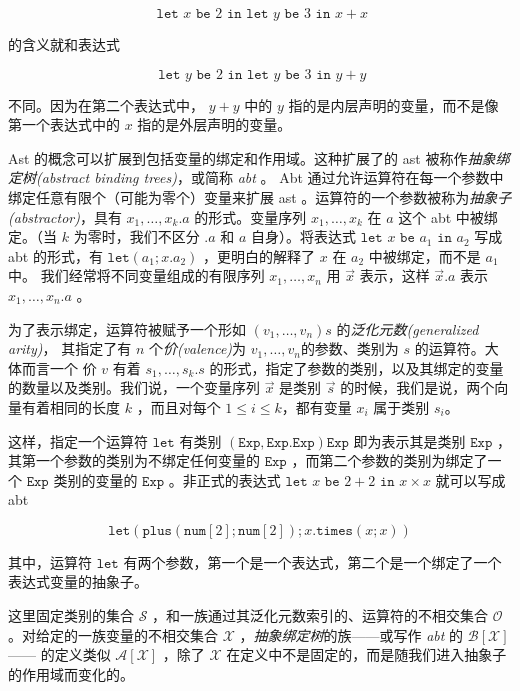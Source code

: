 \[\texttt{ let } x \texttt{ be } 2 \texttt{ in} \texttt{ let } y \texttt{ be } 3 \texttt{ in } x+x\]

的含义就和表达式

\[\texttt{ let } y \texttt{ be } 2 \texttt{ in} \texttt{ let } y \texttt{ be } 3 \texttt{ in } y+y\]

不同。因为在第二个表达式中， \(y+y\) 中的 \(y\)
指的是内层声明的变量，而不是像第一个表达式中的 \(x\)
指的是外层声明的变量。

Ast 的概念可以扩展到包括变量的绑定和作用域。这种扩展了的 ast
被称作\emph{抽象绑定树(abstract binding trees)}，或简称 \emph{abt} 。
Abt 通过允许运算符在每一个参数中绑定任意有限个（可能为零个）变量来扩展
ast 。运算符的一个参数被称为\emph{抽象子(abstractor)}，具有
\(x_1,\dots,x_k.a\) 的形式。变量序列 \(x_1,\dots ,x_k\) 在 \(a\) 这个
abt 中被绑定。（当 \(k\) 为零时，我们不区分 \(.a\) 和 \(a\)
自身）。将表达式 \(\texttt{let } x\texttt{ be } a_1 \texttt{ in } a_2\)
写成 abt 的形式，有 \(\texttt{let}(a_1;x.a_2)\) ，更明白的解释了 \(x\)
在 \(a_2\) 中被绑定，而不是 \(a_1\) 中。
我们经常将不同变量组成的有限序列 \(x_1, \dots , x_n\) 用 \(\vec{x}\)
表示，这样 \(\vec{x}.a\) 表示 \(x_1,\dots,x_n.a\) 。

为了表示绑定，运算符被赋予一个形如 \((v_1,\dots,v_n)s\)
的\emph{泛化元数(generalized arity)}， 其指定了有 \(n\)
个\emph{价(valence)}为 \(v_1,\dots,v_n\)的参数、类别为 \(s\)
的运算符。大体而言一个 价 \(v\) 有着 \(s_1,\dots,s_k.s\)
的形式，指定了参数的类别，以及其绑定的变量的数量以及类别。我们说，一个变量序列
\(\vec{x}\) 是类别 \(\vec{s}\) 的时候，我们是说，两个向量有着相同的长度
\(k\) ，而且对每个 \(1\leq i\leq k\)，都有变量 \(x_i\) 属于类别
\(s_i\)。

这样，指定一个运算符 \(\texttt{let}\) 有类别
\((\texttt{Exp}, \texttt{Exp.Exp})\texttt{Exp}\) 即为表示其是类别
\(\texttt{Exp}\) ，其第一个参数的类别为不绑定任何变量的 \(\texttt{Exp}\)
，而第二个参数的类别为绑定了一个 \(\texttt{Exp}\) 类别的变量的
\(\texttt{Exp}\) 。非正式的表达式
\(\texttt{let } x\texttt{ be } 2+2 \texttt{ in } x\times x\) 就可以写成
abt

\[\texttt{let}(\texttt{plus}(\texttt{num}[2];\texttt{num}[2]);x.\texttt{times}(x;x))\]

其中，运算符 \(\texttt{let}\)
有两个参数，第一个是一个表达式，第二个是一个绑定了一个表达式变量的抽象子。

这里固定类别的集合 \(\mathcal{S}\)
，和一族通过其泛化元数索引的、运算符的不相交集合 \(\mathcal{O}\)
。对给定的一族变量的不相交集合 \(\mathcal{X}\)
，\emph{抽象绑定树}的族——或写作 \emph{abt} 的 \(\mathcal{B[X]}\)——
的定义类似 \(\mathcal{A[X]}\) ，除了 \(\mathcal{X}\)
在定义中不是固定的，而是随我们进入抽象子的作用域而变化的。

